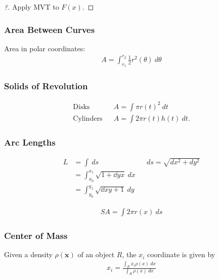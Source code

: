 \begin{proof}[?]

Apply MVT to \(F(x)\).

\end{proof}

\hypertarget{area-between-curves}{%
\subsubsection{Area Between Curves}\label{area-between-curves}}

Area in polar coordinates:
\begin{align*}
A = \int_{r_1}^{r_2} \frac{1}{2}r^2(\theta) ~d\theta
\end{align*}

\hypertarget{solids-of-revolution}{%
\subsubsection{Solids of Revolution}\label{solids-of-revolution}}

\begin{align*}  
\text{Disks} && A = \int \pi r(t)^2 ~dt \\
\text{Cylinders} && A = \int 2\pi r(t)h(t) ~dt
.\end{align*}

\hypertarget{arc-lengths}{%
\subsubsection{Arc Lengths}\label{arc-lengths}}

\begin{align*}
L 
&= \int ~ds  && ds = \sqrt{dx^2 + dy^2} \\
&= \int_{x_0}^{x_1}\sqrt{1 + \dd{y}{x}}~dx \\
&= \int_{y_0}^{y_1}\sqrt{\dd{x}{y} + 1}~dy
\end{align*}

\begin{align*}
SA = \int 2 \pi r(x) ~ds
\end{align*}

\hypertarget{center-of-mass}{%
\subsubsection{Center of Mass}\label{center-of-mass}}

Given a density \(\rho(\mathbf x)\) of an object \(R\), the \(x_i\)
coordinate is given by
\begin{align*}
x_i = 
\frac
{\displaystyle\int_R x_i\rho(x) ~dx}
{\displaystyle\int_R \rho(x)~dx}
\end{align*}

